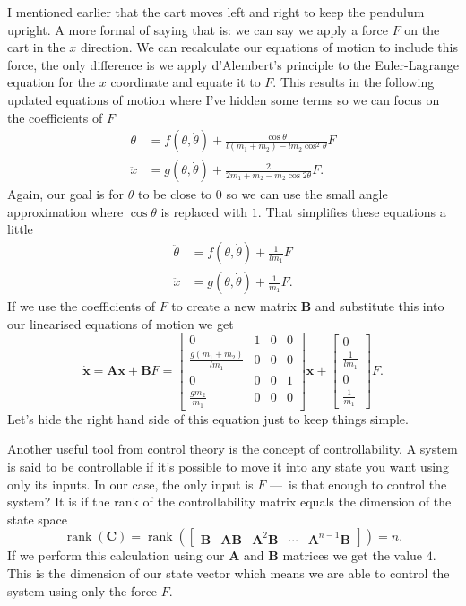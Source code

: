 \documentclass{article}
\DeclareMathOperator{\rank}{rank}
\renewcommand{\vec}[1]{\boldsymbol{\mathbf{#1}}}
\newcommand{\dvec}[1]{\dot{\vec{#1}}}
\begin{document}
I mentioned earlier that the cart moves left and right to keep the pendulum upright. A more formal of saying that is: we can say we apply a force $F$ on the cart in the $x$ direction. We can recalculate our equations of motion to include this force, the only difference is we apply d'Alembert's principle to the Euler-Lagrange equation for the $x$ coordinate and equate it to $F$. This results in the following updated equations of motion where I've hidden some terms so we can focus on the coefficients of $F$ \begin{align*}
  \ddot{\theta} & = f(\theta, \dot{\theta}) + \frac{\cos \theta}{l (m_1 + m_2) - l m_2 \cos^2 \theta} F \\
  \ddot{x}      & = g(\theta, \dot{\theta}) + \frac{2}{2 m_1 + m_2 - m_2 \cos 2 \theta} F.
\end{align*} Again, our goal is for $\theta$ to be close to $0$ so we can use the small angle approximation where $\cos \theta$ is replaced with $1$. That simplifies these equations a little \begin{align*}
  \ddot{\theta} & = f(\theta, \dot{\theta}) + \frac{1}{l m_1} F \\
  \ddot{x}      & = g(\theta, \dot{\theta}) + \frac{1}{m_1} F.
\end{align*} If we use the coefficients of $F$ to create a new matrix $\vec{B}$ and substitute this into our linearised equations of motion we get \[\dvec{x} = \vec{A} \vec{x} + \vec{B} F = \begin{bmatrix}
                 0                           & 1 & 0 & 0 \\
                 \frac{g (m_1 + m_2)}{l m_1} & 0 & 0 & 0 \\
                 0                           & 0 & 0 & 1 \\
                 \frac{g m_2}{m_1}           & 0 & 0 & 0
               \end{bmatrix} \vec{x} + \begin{bmatrix}
                                         0               \\
                                         \frac{1}{l m_1} \\
                                         0               \\
                                         \frac{1}{m_1}
\end{bmatrix} F.\] Let's hide the right hand side of this equation just to keep things simple.

Another useful tool from control theory is the concept of controllability. A system is said to be controllable if it's possible to move it into any state you want using only its inputs. In our case, the only input is $F$ — is that enough to control the system? It is if the rank of the controllability matrix equals the dimension of the state space \[\rank(\vec{C}) = \rank(\begin{bmatrix}
      \vec{B} & \vec{A} \vec{B} & \vec{A}^2 \vec{B} & \cdots & \vec{A}^{n - 1} \vec{B}
\end{bmatrix}) = n.\] If we perform this calculation using our $\vec{A}$ and $\vec{B}$ matrices we get the value $4$. This is the dimension of our state vector which means we are able to control the system using only the force $F$.
\end{document}
